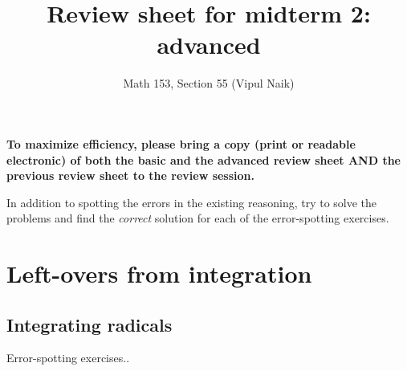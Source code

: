 \documentclass[10pt]{amsart}
\title{Review sheet for midterm 2: advanced}
\author{Math 153, Section 55 (Vipul Naik)}
\begin{document}
\maketitle

{\bf To maximize efficiency, please bring a copy (print or readable
electronic) of both the basic and the advanced review sheet AND the
previous review sheet to the review session.}

In addition to spotting the errors in the existing reasoning, try to
solve the problems and find the {\em correct} solution for each of the
error-spotting exercises.

\section{Left-overs from integration}

\subsection{Integrating radicals}

Error-spotting exercises..
\end{document}
